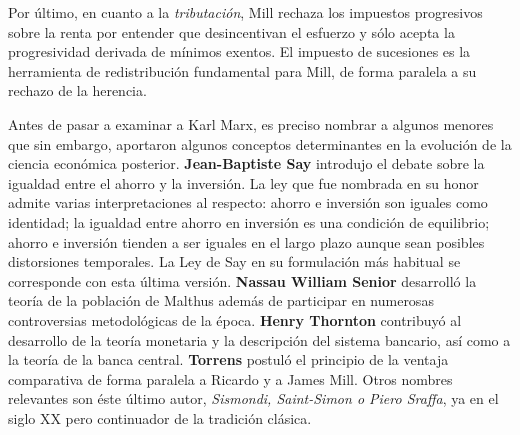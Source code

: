 \documentclass{nuevotema}
\begin{document}
Por último, en cuanto a la \textit{tributación}, Mill rechaza los impuestos progresivos sobre la renta por entender que desincentivan el esfuerzo y sólo acepta la progresividad derivada de mínimos exentos. El impuesto de sucesiones es la herramienta de redistribución fundamental para Mill, de forma paralela a su rechazo de la herencia.

Antes de pasar a examinar a Karl Marx, es preciso nombrar a algunos  menores que sin embargo, aportaron algunos conceptos determinantes en la evolución de la ciencia económica posterior. \textbf{Jean-Baptiste Say} introdujo el debate sobre la igualdad entre el ahorro y la inversión. La ley que fue nombrada en su honor admite varias interpretaciones al respecto: ahorro e inversión son iguales como identidad; la igualdad entre ahorro en inversión es una condición de equilibrio; ahorro e inversión tienden a ser iguales en el largo plazo aunque sean posibles distorsiones temporales. La Ley de Say en su formulación más habitual se corresponde con esta última versión. \textbf{Nassau William Senior} desarrolló la teoría de la población de Malthus además de participar en numerosas controversias metodológicas de la época. \textbf{Henry Thornton} contribuyó al desarrollo de la teoría monetaria y la descripción del sistema bancario, así como a la teoría de la banca central. \textbf{Torrens} postuló el principio de la ventaja comparativa de forma paralela a Ricardo y a James Mill. Otros nombres relevantes son éste último autor, \textit{Sismondi, Saint-Simon o Piero Sraffa}, ya en el siglo XX pero continuador de la tradición clásica. 
\end{document}

